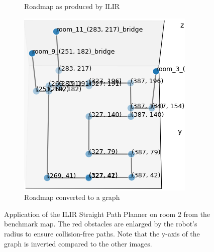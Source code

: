 \begin{figure}[h]
\begin{subfigure}{.25\textwidth}
      \caption{Roadmap as produced by ILIR}
    \end{subfigure}%
    \begin{subfigure}{.25\textwidth}
      \centering
      \includegraphics[width=\textwidth]{figures/50_implementation/ryu_room2_roadmap_graph.png}
      \caption{Roadmap converted to a graph}
    \end{subfigure}
    \caption[Application of the ILIR Straight Path Planner on room 2 from the benchmark map]{Application of the ILIR Straight Path Planner on room 2 from the benchmark map. The red obstacles are enlarged by the robot's radius to ensure collision-free paths. Note that the y-axis of the graph is inverted compared to the other images.}
    \label{fig:ilir_room_roadmap}
\end{figure}
